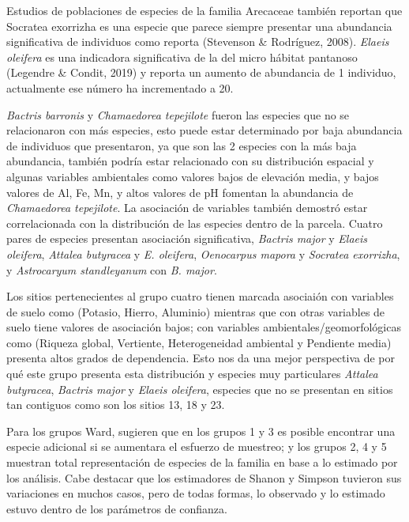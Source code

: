 \documentclass[11pt,]{article}
\begin{document}
Estudios de poblaciones de especies de la familia Arecaceae también
reportan que Socratea exorrizha es una especie que parece siempre
presentar una abundancia significativa de individuos como reporta
(Stevenson \& Rodríguez, 2008). \emph{Elaeis oleifera} es una indicadora
significativa de la del micro hábitat pantanoso (Legendre \& Condit,
2019) y reporta un aumento de abundancia de 1 individuo, actualmente ese
número ha incrementado a 20.

\emph{Bactris barronis} y \emph{Chamaedorea tepejilote} fueron las
especies que no se relacionaron con más especies, esto puede estar
determinado por baja abundancia de individuos que presentaron, ya que
son las 2 especies con la más baja abundancia, también podría estar
relacionado con su distribución espacial y algunas variables ambientales
como valores bajos de elevación media, y bajos valores de Al, Fe, Mn, y
altos valores de pH fomentan la abundancia de \emph{Chamaedorea
tepejilote}. La asociación de variables también demostró estar
correlacionada con la distribución de las especies dentro de la parcela.
Cuatro pares de especies presentan asociación significativa,
\emph{Bactris major} y \emph{Elaeis oleifera}, \emph{Attalea butyracea}
y \emph{E. oleifera}, \emph{Oenocarpus mapora} y \emph{Socratea
exorrizha}, y \emph{Astrocaryum standleyanum} con \emph{B. major}.

Los sitios pertenecientes al grupo cuatro tienen marcada asociaión con
variables de suelo como (Potasio, Hierro, Aluminio) mientras que con
otras variables de suelo tiene valores de asociación bajos; con
variables ambientales/geomorfológicas como (Riqueza global, Vertiente,
Heterogeneidad ambiental y Pendiente media) presenta altos grados de
dependencia. Esto nos da una mejor perspectiva de por qué este grupo
presenta esta distribución y especies muy particulares \emph{Attalea
butyracea}, \emph{Bactris major} y \emph{Elaeis oleifera}, especies que
no se presentan en sitios tan contiguos como son los sitios 13, 18 y 23.

Para los grupos Ward, sugieren que en los grupos 1 y 3 es posible
encontrar una especie adicional si se aumentara el esfuerzo de muestreo;
y los grupos 2, 4 y 5 muestran total representación de especies de la
familia en base a lo estimado por los análisis. Cabe destacar que los
estimadores de Shanon y Simpson tuvieron sus variaciones en muchos
casos, pero de todas formas, lo observado y lo estimado estuvo dentro de
los parámetros de confianza.
\end{document}
